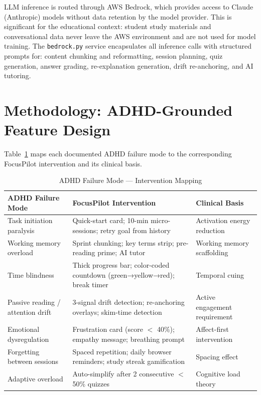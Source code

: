 \documentclass[conference]{IEEEtran}
\begin{document}
LLM inference is routed through AWS Bedrock, which provides access to Claude (Anthropic) models without data retention by the model provider. This is significant for the educational context: student study materials and conversational data never leave the AWS environment and are not used for model training. The \texttt{bedrock.py} service encapsulates all inference calls with structured prompts for: content chunking and reformatting, session planning, quiz generation, answer grading, re-explanation generation, drift re-anchoring, and AI tutoring.

\section{Methodology: ADHD-Grounded Feature Design}

Table~\ref{tab:features} maps each documented ADHD failure mode to the corresponding FocusPilot intervention and its clinical basis.

\begin{table}[htbp]
\caption{ADHD Failure Mode — Intervention Mapping}
\label{tab:features}
\renewcommand{\arraystretch}{1.3}
\begin{tabular}{>{\raggedright}p{2cm}>{\raggedright}p{2.8cm}>{\raggedright\arraybackslash}p{2.5cm}}
\toprule
\textbf{ADHD Failure Mode} & \textbf{FocusPilot Intervention} & \textbf{Clinical Basis} \\
\midrule
Task initiation paralysis & Quick-start card; 10-min micro-sessions; retry goal from history & Activation energy reduction~\cite{brown2013adhd} \\
\addlinespace
Working memory overload & Sprint chunking; key terms strip; pre-reading prime; AI tutor & Working memory scaffolding~\cite{alloway2006working} \\
\addlinespace
Time blindness & Thick progress bar; color-coded countdown (green→yellow→red); break timer & Temporal cuing~\cite{barkley2001time} \\
\addlinespace
Passive reading / attention drift & 3-signal drift detection; re-anchoring overlays; skim-time detection & Active engagement requirement~\cite{faraone2015attention} \\
\addlinespace
Emotional dysregulation & Frustration card (score $<$ 40\%); empathy message; breathing prompt & Affect-first intervention~\cite{shaw2014emotion} \\
\addlinespace
Forgetting between sessions & Spaced repetition; daily browser reminders; study streak gamification & Spacing effect~\cite{cepeda2006distributed} \\
\addlinespace
Adaptive overload & Auto-simplify after 2 consecutive $<$50\% quizzes & Cognitive load theory~\cite{sweller1988cognitive} \\
\bottomrule
\end{tabular}
\end{table}
\end{document}
